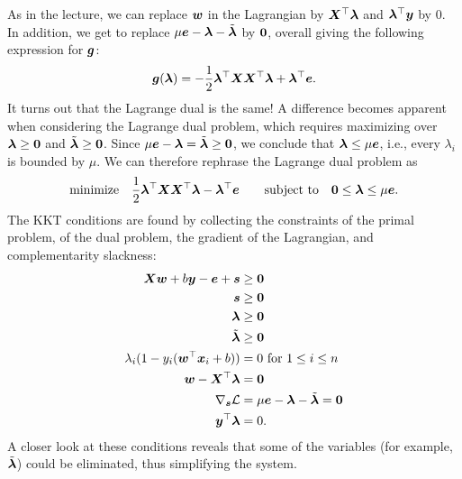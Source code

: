 \documentclass{article}
\begin{document}
As in the lecture, we can replace $\bm{w}$ in the Lagrangian by $\bm{X}^{\top}\bm{\lambda}$ and $\bm{\lambda}^{\top}\bm{y}$ by $0$. In addition, we get to replace $\mu\bm{e}-\bm{\lambda}-\tilde{\bm{\lambda}}$ by $\bm{0}$, overall giving the following expression for $\bm{g}$:
\begin{equation*}
 \bm{g}(\bm{\lambda}) = -\frac{1}{2}\bm{\lambda}^{\top}\bm{X}\bm{X}^{\top}\bm{\lambda}+\bm{\lambda}^{\top}\bm{e}.
\end{equation*}
It turns out that the Lagrange dual is the same! A difference becomes apparent when considering the Lagrange dual problem, which requires maximizing over $\bm{\lambda}\geq \bm{0}$ and $\tilde{\bm{\lambda}}\geq \bm{0}$. Since $\mu\bm{e}-\bm{\lambda}=\tilde{\bm{\lambda}}\geq \bm{0}$, we conclude that $\bm{\lambda}\leq \mu \bm{e}$, i.e., every $\lambda_i$ is bounded by $\mu$. We can therefore rephrase the Lagrange dual problem as
\begin{equation*}
  \text{minimize}\quad \frac{1}{2}\bm{\lambda}^{\top}\bm{X}\bm{X}^{\top}\bm{\lambda}-\bm{\lambda}^{\top}\bm{e} \quad \quad\text{subject to}\quad \bm{0}\leq \bm{\lambda} \leq \mu\bm{e}.
\end{equation*}
The KKT conditions are found by collecting the constraints of the primal problem, of the dual problem, the gradient of the Lagrangian, and complementarity slackness:
\begin{align*}
   \bm{X}\bm{w}+b\bm{y}-\bm{e}+\bm{s} & \geq \bm{0}\\
   \bm{s}&\geq \bm{0}   \\
   \bm{\lambda}&\geq \bm{0}\\
   \tilde{\bm{\lambda}}&\geq \bm{0}\\
   \lambda_i (1-y_i(\bm{w}^{\top}\bm{x}_i+b)) &= 0 \text{ for } 1\leq i\leq n\\
   \bm{w}-\bm{X}^{\top}\bm{\lambda} &= \bm{0}\\
   \nabla_{\bm{s}}\mathcal{L} &= \mu\bm{e}-\bm{\lambda}-\tilde{\bm{\lambda}} = \bm{0}\\
   \bm{y}^{\top}\bm{\lambda} &= 0.
\end{align*}
A closer look at these conditions reveals that some of the variables (for example, $\tilde{\bm{\lambda}}$) could be eliminated, thus simplifying the system.
\end{document}
